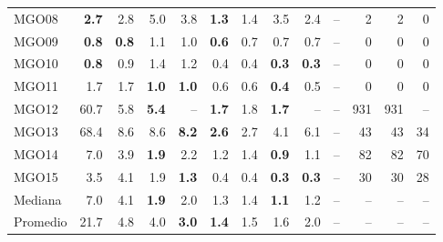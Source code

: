 \begin{table}[!htbp]
\begin{tabular}{l rrrr | rrrr | rrrr}
MGO08 & \textbf{2.7} & 2.8 & 5.0 & 3.8 & \textbf{1.3} & 1.4 & 3.5 & 2.4 & -- & 2 & 2 & 0 \\
MGO09 & \textbf{0.8} & \textbf{0.8} & 1.1 & 1.0 & \textbf{0.6} & 0.7 & 0.7 & 0.7 & -- & 0 & 0 & 0 \\
MGO10 & \textbf{0.8} & 0.9 & 1.4 & 1.2 & 0.4 & 0.4 & \textbf{0.3} & \textbf{0.3} & -- & 0 & 0 & 0 \\
MGO11 & 1.7 & 1.7 & \textbf{1.0} & \textbf{1.0} & 0.6 & 0.6 & \textbf{0.4} & 0.5 & -- & 0 & 0 & 0 \\
MGO12 & 60.7 & 5.8 & \textbf{5.4} & -- & \textbf{1.7} & 1.8 & \textbf{1.7} & -- & -- & 931 & 931 & -- \\
MGO13 & 68.4 & 8.6 & 8.6 & \textbf{8.2} & \textbf{2.6} & 2.7 & 4.1 & 6.1 & -- & 43 & 43 & 34 \\
MGO14 & 7.0 & 3.9 & \textbf{1.9} & 2.2 & 1.2 & 1.4 & \textbf{0.9} & 1.1 & -- & 82 & 82 & 70 \\
MGO15 & 3.5 & 4.1 & 1.9 & \textbf{1.3} & 0.4 & 0.4 & \textbf{0.3} & \textbf{0.3} & -- & 30 & 30 & 28 \\
\midrule
Mediana & 7.0 & 4.1 & \textbf{1.9} & 2.0 & 1.3 & 1.4 & \textbf{1.1} & 1.2 & -- & -- & -- & -- \\
Promedio & 21.7 & 4.8 & 4.0 & \textbf{3.0} & \textbf{1.4} & 1.5 & 1.6 & 2.0 & -- & -- & -- & -- \\
\bottomrule
\end{tabular}
\end{table}

